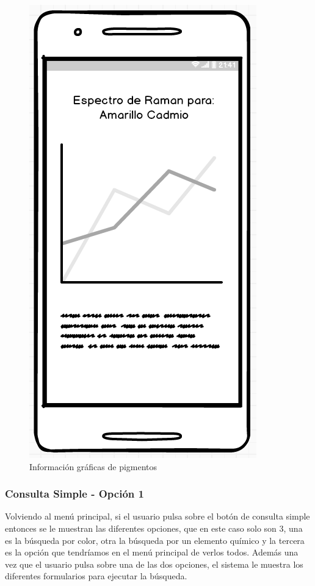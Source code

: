 \begin{multicols}{2}
    \begin{figure}[H]
    \centering
    \includegraphics[scale=0.6]{imagenes/diseno/infoGraficas.png}
    \caption{Información gráficas de pigmentos}
    \label{fig:infoGraficas}
    \end{figure}
\end{multicols}

\subsubsection*{Consulta Simple - Opción 1}

Volviendo al menú principal, si el usuario pulsa sobre el botón de consulta simple entonces se le muestran las diferentes opciones, que en este caso solo son 3, una es la búsqueda por color, otra la búsqueda por un elemento químico y la tercera es la opción que tendríamos en el menú principal de verlos todos. Además una vez que el usuario pulsa sobre una de las dos opciones, el sistema le muestra los diferentes formularios para ejecutar la búsqueda. 

